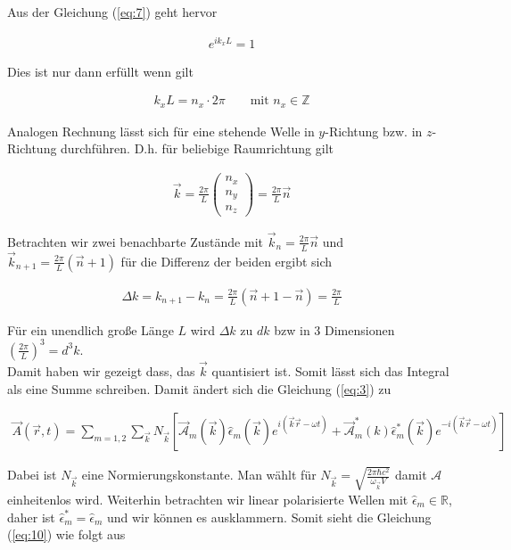 Aus der Gleichung (\ref{eq:7}) geht hervor

\begin{align}
  \label{eq:6}
  e^{i k_x L} = 1
\end{align}

Dies ist nur dann erfüllt wenn gilt

\begin{align}
  \label{eq:8}
  k_x L = n_x\cdot 2\pi \qquad \text{mit }n_x\in \mathds Z
\end{align}

Analogen Rechnung lässt sich für eine stehende Welle in \(y\)-Richtung bzw. in \(z\)-Richtung durchführen. D.h. für beliebige Raumrichtung gilt

\begin{align}
  \label{eq:9}
  \vec k = \frac{2\pi}{L}
  \begin{pmatrix}
    n_x\\n_y\\n_z
  \end{pmatrix}
= \frac{2\pi}{L} \vec n
\end{align}


Betrachten wir zwei benachbarte Zustände mit \(\vec k_n = \frac{2\pi}{L}\vec n\) und \(\vec k_{n+1} = \frac{2\pi}{L}(\vec n+1) \) für die Differenz der beiden ergibt sich

\begin{align}
  \label{eq:30}
  \Delta k = k_{n+1} - k_n = \frac{2\pi}{L}(\vec n +1 - \vec n) = \frac{2\pi}{L} 
\end{align}

Für ein unendlich große Länge \(L\) wird \(\Delta k\) zu \(dk\) bzw in 3 Dimensionen \(\left(\frac{2\pi}{L}\right)^3 = d^3k\).\\

Damit haben wir gezeigt dass, das \(\vec k\) quantisiert ist. Somit lässt sich das Integral als eine Summe schreiben. Damit ändert sich die Gleichung (\ref{eq:3}) zu

\begin{align}
  \label{eq:10}
  \vec A(\vec r, t) =\sum_{m=1,2} \sum_{\vec k}  N_{\vec k} \left[  \vec{\mathcal A}_m (\vec k) \hat \epsilon_m (\vec k) e^{i(\vec k\vec r-\omega t)} + \vec{\mathcal A}^*_m (k)\hat\epsilon^*_m(\vec k) e^{-i(\vec k\vec r-\omega t)}\right]
\end{align}

Dabei ist \(N_{\vec k}\) eine Normierungskonstante. Man wählt für \(N_{\vec k}=\sqrt{\frac{2\pi\hbar c^2}{\omega_{\vec k}V}}\) damit \(\mathcal A\) einheitenlos wird.  Weiterhin betrachten wir linear polarisierte Wellen mit \(\hat \epsilon_m \in \mathds{R} \), daher ist \(\hat \epsilon_m^* = \hat \epsilon_m \) und wir können es ausklammern. Somit sieht die Gleichung (\ref{eq:10}) wie folgt aus

